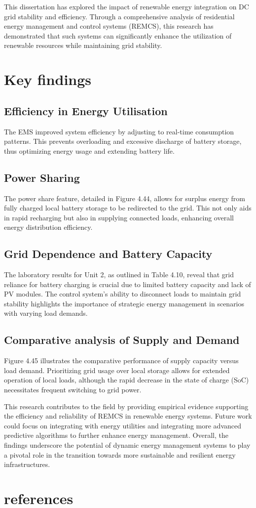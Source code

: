 This dissertation has explored the impact of renewable energy integration on DC grid stability and efficiency. Through a comprehensive analysis of residential energy management and control systems (REMCS), this research has demonstrated that such systems can significantly enhance the utilization of renewable resources while maintaining grid stability.\par

\section{Key findings}
\subsection{Efficiency in Energy Utilisation}
The EMS improved system efficiency by adjusting to real-time consumption patterns. This prevents overloading and excessive discharge of battery storage, thus optimizing energy usage and extending battery life.\par
\subsection{Power Sharing}
The power share feature, detailed in Figure 4.44, allows for surplus energy from fully charged local battery storage to be redirected to the grid. This not only aids in rapid recharging but also in supplying connected loads, enhancing overall energy distribution efficiency.\par
\subsection{Grid Dependence and Battery Capacity}
The laboratory results for Unit 2, as outlined in Table 4.10, reveal that grid reliance for battery charging is crucial due to limited battery capacity and lack of PV modules. The control system’s ability to disconnect loads to maintain grid stability highlights the importance of strategic energy management in scenarios with varying load demands.\par
\subsection{Comparative analysis of Supply and Demand}
Figure 4.45 illustrates the comparative performance of supply capacity versus load demand. Prioritizing grid usage over local storage allows for extended operation of local loads, although the rapid decrease in the state of charge (SoC) necessitates frequent switching to grid power.\par
This research contributes to the field by providing empirical evidence supporting the efficiency and reliability of REMCS in renewable energy systems. Future work could focus on integrating with energy utilities and integrating more advanced predictive algorithms to further enhance energy management. Overall, the findings underscore the potential of dynamic energy management systems to play a pivotal role in the transition towards more sustainable and resilient energy infrastructures.\par

\section{references}
